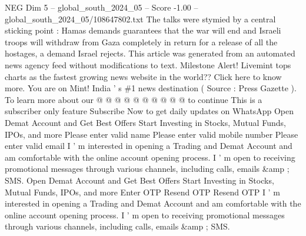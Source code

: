 \begin{textsample}{NEG Dim 5 – global\_south\_2024\_05 – Score -1.00 – global\_south\_2024\_05/108647802.txt}
The talks were stymied by a central sticking point : Hamas demands guarantees that the war will end and Israeli troops will withdraw from Gaza completely in return for a release of all the hostages, a demand Israel rejects.
This article was generated from an automated news agency feed without modifications to text.
Milestone Alert!
Livemint tops charts as the fastest growing news website in the world??
Click here to know more.
You are on Mint!
India ' s \#1 news destination ( Source : Press Gazette ).
To learn more about our @ @ @ @ @ @ @ @ @ @ to continue This is a subscriber only feature Subscribe Now to get daily updates on WhatsApp Open Demat Account and Get Best Offers Start Investing in Stocks, Mutual Funds, IPOs, and more Please enter valid name Please enter valid mobile number Please enter valid email I ' m interested in opening a Trading and Demat Account and am comfortable with the online account opening process.
I ' m open to receiving promotional messages through various channels, including calls, emails \&amp ; SMS.
Open Demat Account and Get Best Offers Start Investing in Stocks, Mutual Funds, IPOs, and more Enter OTP Resend OTP Resend OTP I ' m interested in opening a Trading and Demat Account and am comfortable with the online account opening process.
I ' m open to receiving promotional messages through various channels, including calls, emails \&amp ; SMS.

\end{textsample}
